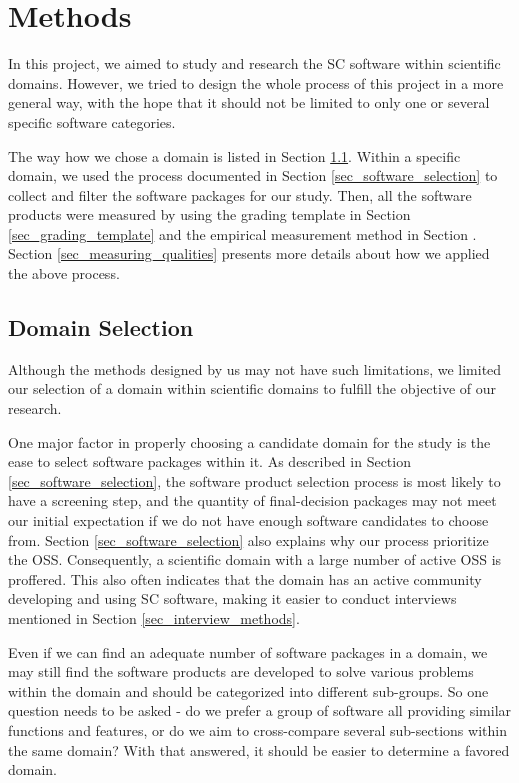 \chapter{Methods}
\label{ch_methods}


In this project, we aimed to study and research the SC software within scientific domains. However, we tried to design the whole process of this project in a more general way, with the hope that it should not be limited to only one or several specific software categories.

The way how we chose a domain is listed in Section \ref{sec_domain_selection}. Within a specific domain, we used the process documented in Section \ref{sec_software_selection} to collect and filter the software packages for our study. Then, all the software products were measured by using the grading template in Section \ref{sec_grading_template} and the empirical measurement method in Section \label{sec_empirical_measurements}. Section \ref{sec_measuring_qualities} presents more details about how we applied the above process.

\section{Domain Selection}
\label{sec_domain_selection}
Although the methods designed by us may not have such limitations, we limited our selection of a domain within scientific domains to fulfill the objective of our research.

One major factor in properly choosing a candidate domain for the study is the ease to select software packages within it. As described in Section \ref{sec_software_selection}, the software product selection process is most likely to have a screening step, and the quantity of final-decision packages may not meet our initial expectation if we do not have enough software candidates to choose from. Section \ref{sec_software_selection} also explains why our process prioritize the OSS. Consequently, a scientific domain with a large number of active OSS is proffered. This also often indicates that the domain has an active community developing and using SC software, making it easier to conduct interviews mentioned in Section \ref{sec_interview_methods}.

Even if we can find an adequate number of software packages in a domain, we may still find the software products are developed to solve various problems within the domain and should be categorized into different sub-groups. So one question needs to be asked - do we prefer a group of software all providing similar functions and features, or do we aim to cross-compare several sub-sections within the same domain? With that answered, it should be easier to determine a favored domain.

